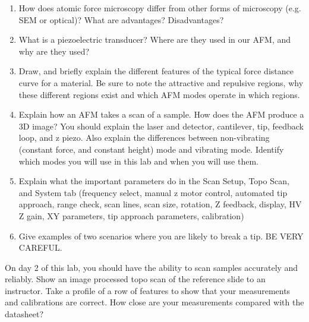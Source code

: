 \documentclass{../signatures}
\begin{document}
\maketitle

\names

\prelab

\begin{enumerate}

    \item How does atomic force microscopy differ from other forms of microscopy (e.g. SEM or optical)?  What are advantages? Disadvantages?
    
    \item What is a piezoelectric transducer? Where are they used in our AFM, and why are they used? 

    \item Draw, and briefly explain the different features of the typical force distance curve for a material. Be sure to note the attractive and repulsive regions, why these different regions exist and which AFM modes operate in which regions. 

    \item Explain how an AFM takes a scan of a sample.  How does the AFM produce a 3D image? You should explain the laser and detector, cantilever, tip, feedback loop, and z piezo. Also explain the differences between non-vibrating (constant force, and constant height) mode and vibrating mode. Identify which modes you will use in this lab and when you will use them. 

    \item Explain what the important parameters do in the Scan Setup, Topo Scan, and System tab (frequency select, manual z motor control, automated tip approach, range check, scan lines, scan size, rotation, Z feedback, display, HV Z gain, XY parameters, tip approach parameters, calibration)

    \item Give examples of two scenarios where you are likely to break a tip. BE VERY CAREFUL.
       \\[36pt]
\end{enumerate}

\prelabsignatures

\midlab

On day 2 of this lab, you should have the ability to scan samples accurately and reliably. Show an image processed topo scan of the reference slide to an instructor.  Take a profile of a row of features to show that your measurements and calibrations are correct. How close are your measurements compared with the datasheet?
\end{document}
